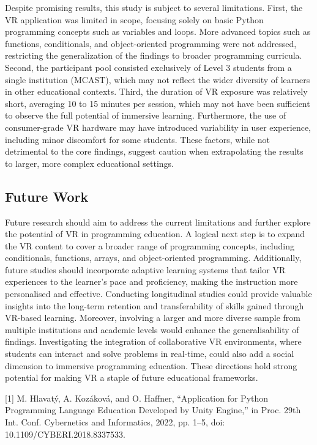 \documentclass[conference]{IEEEtran}
\begin{document}
Despite promising results, this study is subject to several limitations. First, the VR application was limited in scope, focusing solely on basic Python programming concepts such as variables and loops. More advanced topics such as functions, conditionals, and object-oriented programming were not addressed, restricting the generalization of the findings to broader programming curricula. Second, the participant pool consisted exclusively of Level 3 students from a single institution (MCAST), which may not reflect the wider diversity of learners in other educational contexts. Third, the duration of VR exposure was relatively short, averaging 10 to 15 minutes per session, which may not have been sufficient to observe the full potential of immersive learning. Furthermore, the use of consumer-grade VR hardware may have introduced variability in user experience, including minor discomfort for some students. These factors, while not detrimental to the core findings, suggest caution when extrapolating the results to larger, more complex educational settings.


\subsection{Future Work}
Future research should aim to address the current limitations and further explore the potential of VR in programming education. A logical next step is to expand the VR content to cover a broader range of programming concepts, including conditionals, functions, arrays, and object-oriented programming. Additionally, future studies should incorporate adaptive learning systems that tailor VR experiences to the learner’s pace and proficiency, making the instruction more personalised and effective. Conducting longitudinal studies could provide valuable insights into the long-term retention and transferability of skills gained through VR-based learning. Moreover, involving a larger and more diverse sample from multiple institutions and academic levels would enhance the generalisability of findings. Investigating the integration of collaborative VR environments, where students can interact and solve problems in real-time, could also add a social dimension to immersive programming education. These directions hold strong potential for making VR a staple of future educational frameworks.






[1] M. Hlavatý, A. Kozáková, and O. Haffner, “Application for Python Programming Language Education Developed by Unity Engine,” in Proc. 29th Int. Conf. Cybernetics and Informatics, 2022, pp. 1–5, doi: 10.1109/CYBERI.2018.8337533.
\end{document}
